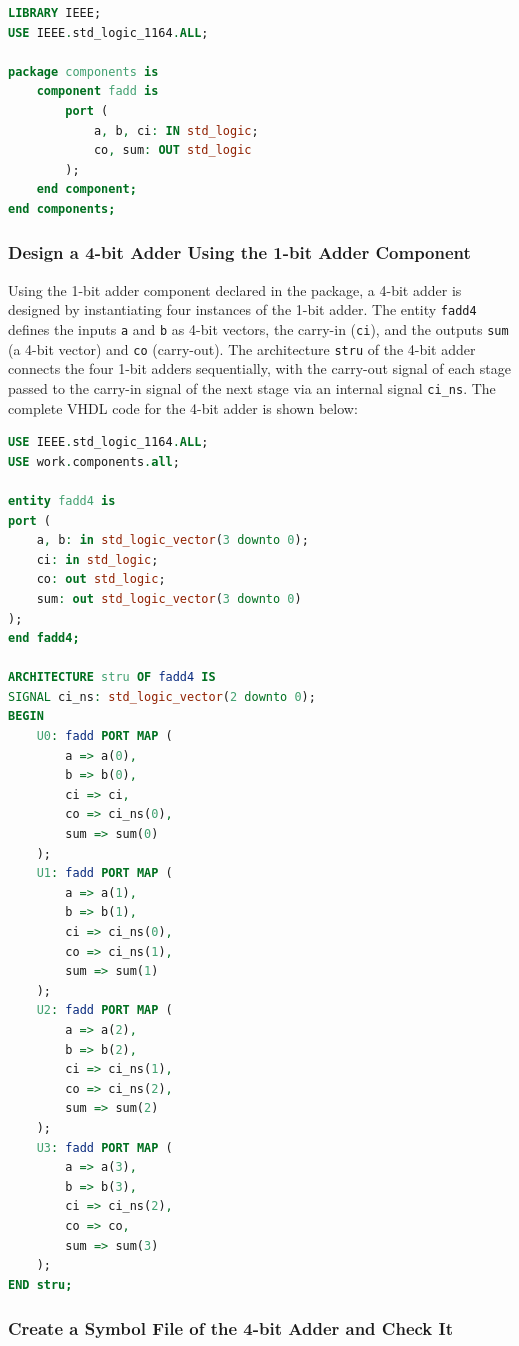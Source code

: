 \documentclass[12pt,a4paper,oneside]{ctexart}
\begin{document}
\begin{lstlisting}[language=VHDL, caption=VHDL Code for Component Declaration, label=lst:component_declaration]
LIBRARY IEEE;
USE IEEE.std_logic_1164.ALL;

package components is
    component fadd is
        port (
            a, b, ci: IN std_logic;
            co, sum: OUT std_logic
        );
    end component;
end components;
\end{lstlisting}

\subsubsection{Design a 4-bit Adder Using the 1-bit Adder Component}
Using the 1-bit adder component declared in the package, a 4-bit adder is designed by instantiating four instances of the 1-bit adder. The entity \texttt{fadd4} defines the inputs \texttt{a} and \texttt{b} as 4-bit vectors, the carry-in (\texttt{ci}), and the outputs \texttt{sum} (a 4-bit vector) and \texttt{co} (carry-out). The architecture \texttt{stru} of the 4-bit adder connects the four 1-bit adders sequentially, with the carry-out signal of each stage passed to the carry-in signal of the next stage via an internal signal \texttt{ci\_ns}. The complete VHDL code for the 4-bit adder is shown below:

\begin{lstlisting}[language=VHDL, caption=VHDL Code for 4-bit Adder, label=lst:fadd4_code]
USE IEEE.std_logic_1164.ALL;
USE work.components.all;

entity fadd4 is
port (
    a, b: in std_logic_vector(3 downto 0);
    ci: in std_logic;
    co: out std_logic;
    sum: out std_logic_vector(3 downto 0)
);
end fadd4;

ARCHITECTURE stru OF fadd4 IS
SIGNAL ci_ns: std_logic_vector(2 downto 0);
BEGIN
    U0: fadd PORT MAP (
        a => a(0),
        b => b(0),
        ci => ci,
        co => ci_ns(0),
        sum => sum(0)
    );
    U1: fadd PORT MAP (
        a => a(1),
        b => b(1),
        ci => ci_ns(0),
        co => ci_ns(1),
        sum => sum(1)
    );
    U2: fadd PORT MAP (
        a => a(2),
        b => b(2),
        ci => ci_ns(1),
        co => ci_ns(2),
        sum => sum(2)
    );
    U3: fadd PORT MAP (
        a => a(3),
        b => b(3),
        ci => ci_ns(2),
        co => co,
        sum => sum(3)
    );
END stru;
\end{lstlisting}


\subsubsection{Create a Symbol File of the 4-bit Adder and Check It}
\end{document}
